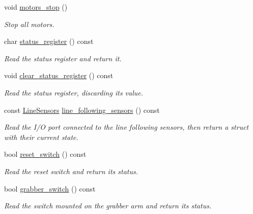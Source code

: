 \begin{DoxyCompactItemize}
void \hyperlink{classIDP_1_1HardwareAbstractionLayer_a4f8f0340f3ac64c3f676b700b7e36229}{motors\_\-stop} ()
\begin{DoxyCompactList}\small\item\em Stop all motors. \item\end{DoxyCompactList}\item 
char \hyperlink{classIDP_1_1HardwareAbstractionLayer_a4867c291e34794d1bb9c0929d5514c5b}{status\_\-register} () const 
\begin{DoxyCompactList}\small\item\em Read the status register and return it. \item\end{DoxyCompactList}\item 
void \hyperlink{classIDP_1_1HardwareAbstractionLayer_a1902d9260758777966ab362e21f3be42}{clear\_\-status\_\-register} () const 
\begin{DoxyCompactList}\small\item\em Read the status register, discarding its value. \item\end{DoxyCompactList}\item 
const \hyperlink{structIDP_1_1LineSensors}{LineSensors} \hyperlink{classIDP_1_1HardwareAbstractionLayer_aca143d627de2ff9942069ad922d17ee5}{line\_\-following\_\-sensors} () const 
\begin{DoxyCompactList}\small\item\em Read the I/O port connected to the line following sensors, then return a struct with their current state. \item\end{DoxyCompactList}\item 
bool \hyperlink{classIDP_1_1HardwareAbstractionLayer_a4ce4bec948d6449e7cab3cfcd0de513f}{reset\_\-switch} () const 
\begin{DoxyCompactList}\small\item\em Read the reset switch and return its status. \item\end{DoxyCompactList}\item 
bool \hyperlink{classIDP_1_1HardwareAbstractionLayer_a82ef6744041c174edb7f8982f44685b7}{grabber\_\-switch} () const 
\begin{DoxyCompactList}\small\item\em Read the switch mounted on the grabber arm and return its status. \item\end{DoxyCompactList}\item 

\end{DoxyCompactItemize}
